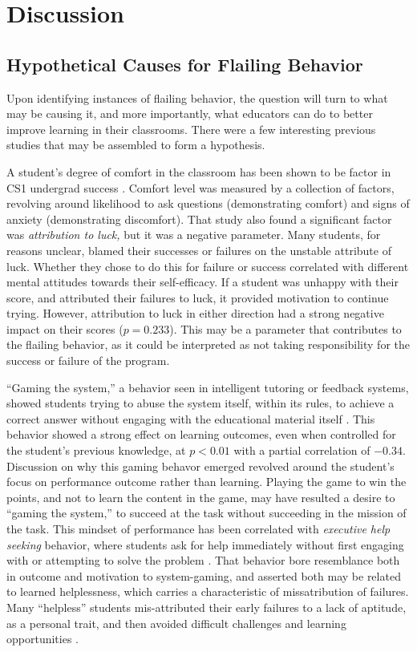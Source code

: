 \chapter{Discussion}

\section{Hypothetical Causes for Flailing Behavior}
Upon identifying instances of flailing behavior, the question will turn to what may be causing it, and more importantly, what educators can do to better improve learning in their classrooms. There were a few interesting previous studies that may be assembled to form a hypothesis. 

A student's degree of comfort in the classroom has been shown to be factor in CS1 undergrad success \citep{wilson-2002}. Comfort level was measured by a collection of factors, revolving around likelihood to ask questions (demonstrating comfort) and signs of anxiety (demonstrating discomfort). That study also found a significant factor was \emph{attribution to luck,} but it was a negative parameter. Many students, for reasons unclear, blamed their successes or failures on the unstable attribute of luck. Whether they chose to do this for failure or success correlated with different mental attitudes towards their self-efficacy. If a student was unhappy with their score, and attributed their failures to luck, it provided motivation to continue trying. However, attribution to luck in either direction had a strong negative impact on their scores ($p=0.233$). This may be a parameter that contributes to the flailing behavior, as it could be interpreted as not taking responsibility for the success or failure of the program. 

``Gaming the system,'' a behavior seen in intelligent tutoring or feedback systems, showed students trying to abuse the system itself, within its rules, to achieve a correct answer without engaging with the educational material itself \citep{baker2004off}. This behavior showed a strong effect on learning outcomes, even when controlled for the student's previous knowledge, at $p<0.01$ with a partial correlation of $-0.34$. Discussion on why this gaming behavor emerged revolved around the student's focus on performance outcome rather than learning. Playing the game to win the points, and not to learn the content in the game, may have resulted a desire to ``gaming the system,'' to succeed at the task without succeeding in the mission of the task. This mindset of performance has been correlated with \emph{executive help seeking} behavior, where students ask for help immediately without first engaging with or attempting to solve the problem \citep{arbreton1998student}. That behavior bore resemblance both in outcome and motivation to system-gaming, and \citeauthor{baker2004off} asserted both may be related to learned helplessness, which carries a characteristic of missatribution of failures. Many ``helpless'' students mis-attributed their early failures to a lack of aptitude, as a personal trait, and then avoided difficult challenges and learning opportunities \citep{dweck1988social}. 

